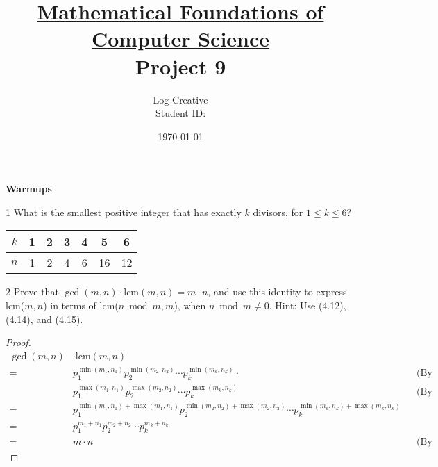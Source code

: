 \documentclass[a4paper,12pt]{article}
\title{\small \underline{Mathematical Foundations of Computer Science}\\\Large Project 9}
\author{Log Creative\\\small Student ID: }
\date{\today}
\makeatletter
\newtheorem*{solution}{Solution}
\theoremstyle{definition}
\renewenvironment{solution}[1][Solution] {\par\pushQED{\qed}\normalfont\topsep6\p@\@plus6\p@\relax\trivlist\item[\hskip\labelsep\bfseries#1\@addpunct{.}]\ignorespaces}{\popQED\endtrivlist\@endpefalse} \makeatother
\newenvironment{problems}{\begin{list}{}{\renewcommand{\makelabel}[1]{\textbf{##1}\hfil}}}{\end{list}}
\makeatother
\begin{document}
\maketitle

\noindent\textbf{Warmups}

\begin{problems}
    \item[1] What  is  the  smallest  positive  integer  that  has  exactly $k$ divisors,  for $1\leq k\leq 6$?
    \begin{solution}
        \begin{tabular}{c|cccccc}
            $k$ & 1 & 2 & 3 & 4 & 5 & 6 \\
            \hline
            $n$ & 1 & 2 & 4 & 6 & 16 & 12 
        \end{tabular}
    \end{solution} 
    \item[2] Prove that $\gcd (m, n)\cdot\text{lcm} (m, n)=m\cdot n$, and use this identity to express lcm($m, n$) in terms of lcm($n\bmod m, m$), when $n \bmod m\neq 0$. Hint: Use (4.12), (4.14), and (4.15).
    \begin{proof}
        \begin{align*}
            \gcd (m,n) &\cdot \text{lcm}(m,n) \\
            =& p_1^{\min(m_1,n_1)}p_2^{\min(m_2,n_2)}\cdots p_k^{\min(m_k,n_k)}\cdot&& \text{(By (4.14))}\\
            &p_1^{\max(m_1,n_1)}p_2^{\max(m_2,n_2)}\cdots p_k^{\max(m_k,n_k)} && \text{(By (4.15))}\\
            =&p_1^{\min(m_1,n_1)+\max(m_1,n_1)}p_2^{\min(m_2,n_2)+\max(m_2,n_2)}\cdots p_k^{\min(m_k,n_k)+\max(m_k,n_k)}\\
            =&p_1^{m_1+n_1}p_2^{m_2+n_2}\cdots p_k^{m_k+n_k}\\
            =&m\cdot n &&\text{(By (4.12))}
        \end{align*}


\end{proof}
\end{problems}
\end{document}
